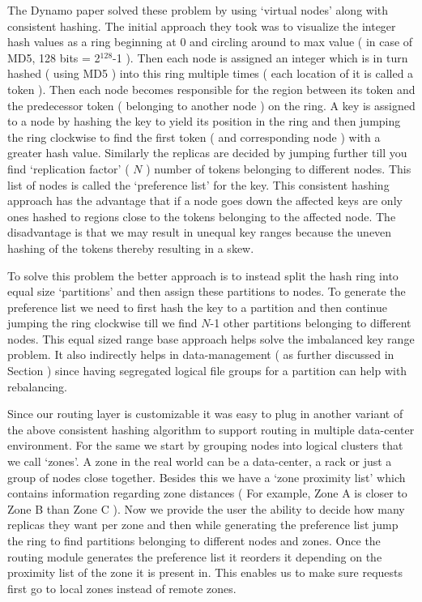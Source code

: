 \documentclass[10pt,twocolumn,preprint,natbib,authoryear]{sigplanconf}
\begin{document}
The Dynamo paper solved these problem by using `virtual nodes' along with consistent hashing. The initial approach they took was to visualize the integer hash values as a ring beginning at 0 and circling around to max value ( in case of MD5, 128 bits = 2$^{128}$-1 ). Then each node is assigned an integer which is in turn hashed ( using MD5 ) into this ring multiple times ( each location of it is called a token ). Then each node becomes responsible for the region between its token and the predecessor token ( belonging to another node ) on the ring. A key is assigned to a node by hashing the key to yield its position in the ring and then jumping the ring clockwise to find the first token ( and corresponding node ) with a greater hash value. Similarly the replicas are decided by jumping further till you find `replication factor' ( $N$ ) number of tokens belonging to different nodes. This list of nodes is called the `preference list' for the key. This consistent hashing approach has the advantage that if a node goes down the affected keys are only ones hashed to regions close to the tokens belonging to the affected node. The disadvantage is that we may result in unequal key ranges because the uneven hashing of the tokens thereby resulting in a skew. 

To solve this problem the better approach is to instead split the hash ring into equal size `partitions' and then assign these partitions to nodes. To generate the preference list we need to first hash the key to a partition and then continue jumping the ring clockwise till we find $N$-1 other partitions belonging to different nodes. This equal sized range base approach helps solve the imbalanced key range problem. It also indirectly helps in data-management ( as further discussed in Section ) since having segregated logical file groups for a partition can help with rebalancing. 

Since our routing layer is customizable it was easy to plug in another variant of the above consistent hashing algorithm to support routing in multiple data-center environment. For the same we start by grouping nodes into logical clusters that we call `zones'. A zone in the real world can be a data-center, a rack or just a group of nodes close together. Besides this we have a `zone proximity list' which contains information regarding zone distances ( For example, Zone A is closer to Zone B than Zone C ). Now we provide the user the ability to decide how many replicas they want per zone and then while generating the preference list jump the ring to find partitions belonging to different nodes and zones. Once the routing module generates the preference list it reorders it depending on the proximity list of the zone it is present in. This enables us to make sure requests first go to local zones instead of remote zones. 
\end{document}

